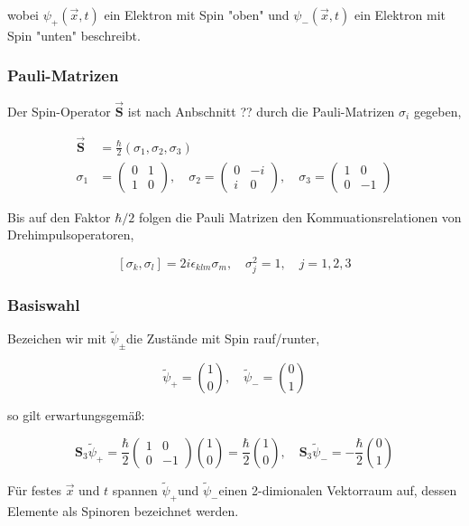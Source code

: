 \documentclass[10pt, letterpaper]{article}
\begin{document}
wobei $\psi_{+}(\vec{x}, t)$ ein Elektron mit Spin "oben" und $\psi_{-}(\vec{x}, t)$ ein Elektron mit Spin "unten" beschreibt.

\subsubsection*{Pauli-Matrizen}
Der Spin-Operator $\overrightarrow{\mathbf{S}}$ ist nach Anbschnitt ?? durch die Pauli-Matrizen $\sigma_{i}$ gegeben,

$$
\begin{aligned}
\overrightarrow{\mathbf{S}} & =\frac{\hbar}{2}\left(\sigma_{1}, \sigma_{2}, \sigma_{3}\right) \\
\sigma_{1} & =\left(\begin{array}{cc}
0 & 1 \\
1 & 0
\end{array}\right), \quad \sigma_{2}=\left(\begin{array}{cc}
0 & -i \\
i & 0
\end{array}\right), \quad \sigma_{3}=\left(\begin{array}{cc}
1 & 0 \\
0 & -1
\end{array}\right)
\end{aligned}
$$

Bis auf den Faktor $\hbar / 2$ folgen die Pauli Matrizen den Kommuationsrelationen von Drehimpulsoperatoren,

$$
\left[\sigma_{k}, \sigma_{l}\right]=2 i \epsilon_{k l m} \sigma_{m}, \quad \sigma_{j}^{2}=1, \quad j=1,2,3
$$

\subsubsection*{Basiswahl}
Bezeichen wir mit $\tilde{\psi}_{ \pm}$die Zustände mit Spin rauf/runter,

$$
\tilde{\psi}_{+}=\binom{1}{0}, \quad \tilde{\psi}_{-}=\binom{0}{1}
$$

so gilt erwartungsgemäß:

$$
\mathbf{S}_{3} \tilde{\psi}_{+}=\frac{\hbar}{2}\left(\begin{array}{cc}
1 & 0 \\
0 & -1
\end{array}\right)\binom{1}{0}=\frac{\hbar}{2}\binom{1}{0}, \quad \mathbf{S}_{3} \tilde{\psi}_{-}=-\frac{\hbar}{2}\binom{0}{1}
$$

Für festes $\vec{x}$ und $t$ spannen $\tilde{\psi}_{+}$und $\tilde{\psi}_{-}$einen 2-dimionalen Vektorraum auf, dessen Elemente als Spinoren bezeichnet werden.
\end{document}
